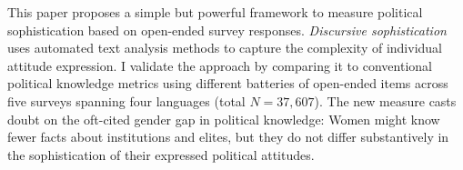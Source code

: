 This paper proposes a simple but powerful framework to measure political sophistication based on open-ended survey responses. \textit{Discursive sophistication} uses automated text analysis methods to capture the complexity of individual attitude expression. I validate the approach by comparing it to conventional political knowledge metrics using different batteries of open-ended items across five surveys spanning four languages (total $N = 37,607$). The new measure casts doubt on the oft-cited gender gap in political knowledge: Women might know fewer facts about institutions and elites, but they do not differ substantively in the sophistication of their expressed political attitudes.